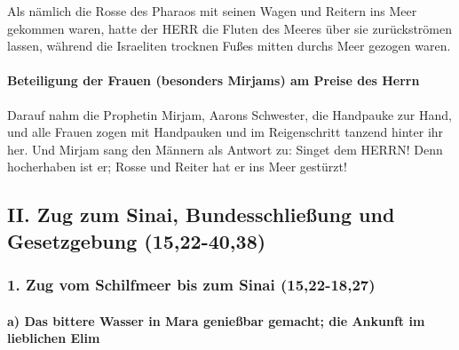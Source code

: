  Als nämlich die Rosse des Pharaos mit seinen Wagen und
Reitern ins Meer gekommen waren, hatte der HERR die Fluten des Meeres
über sie zurückströmen lassen, während die Israeliten trocknen Fußes
mitten durchs Meer gezogen waren.

\hypertarget{beteiligung-der-frauen-besonders-mirjams-am-preise-des-herrn}{%
\paragraph{Beteiligung der Frauen (besonders Mirjams) am Preise des
Herrn}\label{beteiligung-der-frauen-besonders-mirjams-am-preise-des-herrn}}

 Darauf nahm die Prophetin Mirjam, Aarons Schwester, die
Handpauke zur Hand, und alle Frauen zogen mit Handpauken und im
Reigenschritt tanzend hinter ihr her.  Und Mirjam sang
den Männern als Antwort zu: Singet dem HERRN! Denn hocherhaben ist er;
Rosse und Reiter hat er ins Meer gestürzt!

\hypertarget{ii.-zug-zum-sinai-bundesschlieuxdfung-und-gesetzgebung-1522-4038}{%
\subsection{II. Zug zum Sinai, Bundesschließung und Gesetzgebung
(15,22-40,38)}\label{ii.-zug-zum-sinai-bundesschlieuxdfung-und-gesetzgebung-1522-4038}}

\hypertarget{zug-vom-schilfmeer-bis-zum-sinai-1522-1827}{%
\subsubsection{1. Zug vom Schilfmeer bis zum Sinai
(15,22-18,27)}\label{zug-vom-schilfmeer-bis-zum-sinai-1522-1827}}

\hypertarget{a-das-bittere-wasser-in-mara-genieuxdfbar-gemacht-die-ankunft-im-lieblichen-elim}{%
\paragraph{a) Das bittere Wasser in Mara genießbar gemacht; die Ankunft
im lieblichen
Elim}\label{a-das-bittere-wasser-in-mara-genieuxdfbar-gemacht-die-ankunft-im-lieblichen-elim}}

